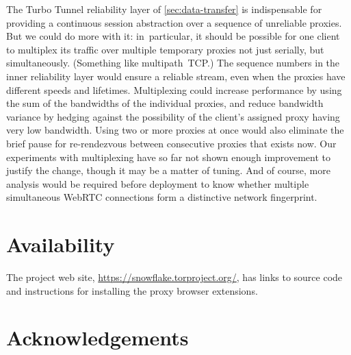 \documentclass[letterpaper,twocolumn]{article}
\begin{document}
The Turbo Tunnel reliability layer of \autoref{sec:data-transfer}
is indispensable for providing a continuous session abstraction
over a sequence of unreliable proxies.
But we could do more with it:
in~particular, it should be possible
for one client to multiplex its traffic
over multiple temporary proxies not just serially, but simultaneously.
(Something like multipath~TCP.)
The sequence numbers in the inner reliability layer
would ensure a reliable stream, even when the proxies
have different speeds and lifetimes.
Multiplexing could increase performance by using the sum
of the bandwidths of the individual proxies,
and reduce bandwidth variance by hedging against the possibility
of the client's assigned proxy having very low bandwidth.
Using two or more proxies at once would also
eliminate the brief pause for re-rendezvous
between consecutive proxies that exists now.
Our experiments with multiplexing have so far
not shown enough improvement to justify the change,
though it may be a matter of tuning.
And of course, more analysis would be required before deployment
to know whether multiple simultaneous WebRTC connections
form a distinctive network fingerprint.

\section*{Availability}

The project web site,
\url{https://snowflake.torproject.org/},
has links to source code
and instructions for installing the proxy browser extensions.

\section*{Acknowledgements}
\end{document}
